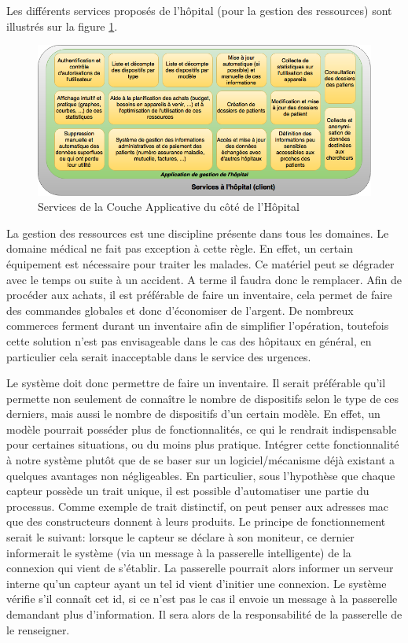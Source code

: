 Les différents services proposés de l'hôpital (pour la gestion des ressources) sont illustrés sur la figure \ref{hopital}.
\newline
\begin{figure}[h!]
	\hspace*{-2.5cm}
	\centering
	\includegraphics[width=1.4\textwidth]{hopital.png}
	\caption{Services de la Couche Applicative du côté de l'Hôpital}
	\label{hopital}
\end{figure}

La gestion des ressources est une discipline présente dans tous les domaines. Le domaine médical ne fait pas exception à cette
règle. En effet, un certain équipement est nécessaire pour traiter les malades. Ce matériel peut se dégrader avec le temps ou
suite à un accident. A terme il faudra donc le remplacer. Afin de procéder aux achats, il est préférable de faire un inventaire,
cela permet de faire des commandes globales et donc d'économiser de l'argent. De nombreux commerces ferment durant un inventaire
afin de simplifier l'opération, toutefois cette solution n'est pas envisageable dans le cas des hôpitaux en général, en
particulier cela serait inacceptable dans le service des urgences.  
\newline

Le système doit donc permettre de faire un inventaire. Il serait préférable qu'il permette non seulement de connaître le nombre de
dispositifs selon le type de ces derniers, mais aussi le nombre de dispositifs d'un certain modèle. En effet, un modèle pourrait
posséder plus de fonctionnalités, ce qui le rendrait indispensable pour certaines situations, ou du moins plus pratique. Intégrer
cette fonctionnalité à notre système plutôt que de se baser sur un logiciel/mécanisme déjà existant a quelques avantages non
négligeables. En particulier, sous l'hypothèse que chaque capteur possède un trait unique, il est possible d'automatiser une
partie du processus. Comme exemple de trait distinctif, on peut penser aux adresses mac que des constructeurs donnent à leurs
produits. Le principe de fonctionnement serait le suivant: lorsque le capteur se déclare à son moniteur, ce dernier informerait le
système (via un message à la passerelle intelligente) de la connexion qui vient de s'établir. La passerelle pourrait alors
informer un serveur interne qu'un capteur ayant un tel id vient d'initier une connexion. Le système vérifie s'il connaît cet id,
si ce n'est pas le cas il envoie un message à la passerelle demandant plus d'information. Il sera alors de la responsabilité de la
passerelle de le renseigner.  
\newline

